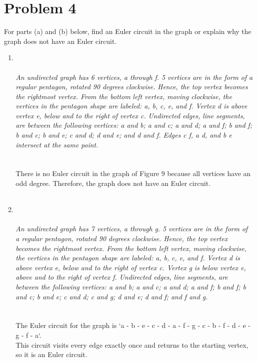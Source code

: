 \documentclass{amsart}
\theoremstyle{definition}
\theoremstyle{Exercise}
\theoremstyle{remark}
\theoremstyle{rule}
\numberwithin{equation}{section}
\begin{document}
\section*{Problem 4}
For parts (a) and (b) below, find an Euler circuit in the graph or explain why the graph does not have an Euler circuit.\\
\begin{enumerate}[label=(\alph*)]
\item
{}\\\\
{\color{blue}{\bf Figure 9:} \emph{An undirected graph has 6 vertices, a through f. 5 vertices are in the form of a regular pentagon, rotated 90 degrees clockwise. Hence, the top vertex becomes the rightmost vertex. From the bottom left vertex, moving clockwise, the vertices in the pentagon shape are labeled: a, b, c, e, and f. Vertex d is above vertex e, below and to the right of vertex c. Undirected edges, line segments, are between the following vertices: a and b; a and c; a and d; a and f; b and f; b and c; b and e; c and d; d and e; and d and f. Edges c f, a d, and b e intersect at the same point.
\\
}
}
\\
\\
There is no Euler circuit in the graph of Figure 9 because all vertices have an odd degree. Therefore, the graph does not have an Euler circuit.
\\\\

\newpage
\item
{}\\\\
{\color{blue}{\bf Figure 10:} \emph{An undirected graph has 7 vertices, a through g. 5 vertices are in the form of a regular pentagon, rotated 90 degrees clockwise. Hence, the top vertex becomes the rightmost vertex. From the bottom left vertex, moving clockwise, the vertices in the pentagon shape are labeled: a, b, c, e, and f. Vertex d is above vertex e, below and to the right of vertex c. Vertex g is below vertex e, above and to the right of vertex f. Undirected edges, line segments, are between the following vertices: a and b; a and c; a and d; a and f; b and f; b and c; b and e; c and d; c and g; d and e; d and f; and f and g.
\\
}
}
\\
\\
The Euler circuit for the graph is `a - b - e - c - d - a - f - g - c - b - f - d - e - g - f - a`.\\
This circuit visits every edge exactly once and returns to the starting vertex, so it is an Euler circuit.
\\\\


\end{enumerate}
\end{document}
